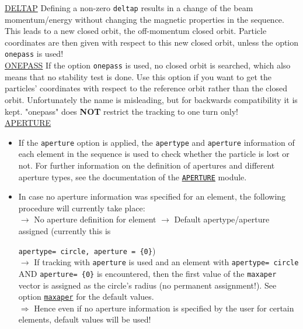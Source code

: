 \begin{description}
          
          \href{track:remarks:deltap:notes}{DELTAP}
          Defining a non-zero \texttt{deltap} results in a change of the 
          beam momentum/energy without changing the magnetic properties in the sequence. This 
          leads to a new closed orbit, the off-momentum closed orbit. Particle coordinates are
          then given with respect to this new closed orbit, unless the option \texttt{onepass}
          is used!
          \\

          \href{track:remarks:onepass:notes}{ONEPASS}
          If the option \texttt{onepass} is used, no closed orbit is searched, which also means 
          that no stability test is done. Use this option if you want to get the particles' coordinates with 
          respect to the reference orbit rather than the closed orbit. Unfortunately the name is misleading, 
          but for backwards compatibility it is kept. "onepass" does \textbf{NOT} restrict the tracking 
          to one turn only!
          \\
          
          \href{track:remarks:aperture:notes}{APERTURE}
          \begin{itemize}
	  \item If the \texttt{aperture} option is applied, the \texttt{apertype} 
            and \texttt{aperture}
            information of each element in the sequence is used to check whether the particle is lost or not. 
            For further information on the definition of apertures and different aperture types, 
            see the documentation of the \href{../Introduction/aperture.html}{\texttt{APERTURE}}
            module.
            
	  \item In case no aperture information was specified for an element, 
            the following procedure will currently take place:
            \\
            $\rightarrow$ No aperture definition for element $\rightarrow$ 
            Default apertype/aperture assigned (currently this is 
            
            \texttt{apertype= circle, aperture = \{0\}}) 
            \\ $\rightarrow$  
            If tracking with \texttt{aperture} is used and an
            element with 
            \texttt{apertype= circle} AND 
            \texttt{aperture= \{0\}} 
            is encountered, then the first value of the \texttt{maxaper} vector
            is assigned as the circle's radius (no permanent assignment!). 
            See option \hyperlink{run}{\texttt{maxaper}} for 
            the default values. 
            \\ $\Rightarrow$
            Hence even if no aperture information is specified by the user for certain elements, 
            default values will be used!
            

\end{itemize}
\end{description}
